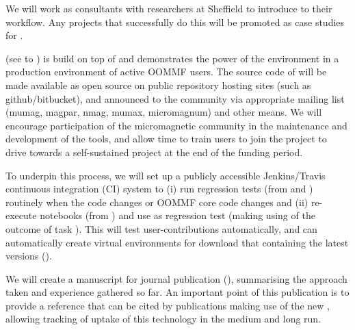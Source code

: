 \begin{workpackage}[id=dissem,wphases=18-48!.5,
  title=Dissemination and Community Building,
  lead=PS,
  PSRM=10, %
  SARM=18,
  USORM=10,
  USHRM=8,
  USRM=24,
  UVRM=2,
  UBRM=4,
]
\begin{tasklist}
\begin{task}[title=Introduce \TheProject to researchers and teachers]
We will work as consultants with researchers at Sheffield to introduce \TheProject to their workflow. Any projects that successfully do this will be promoted as case studies for \TheProject.
\end{task}

\begin{task}[id=dissemination-of-oommf-nb-virtual-environment,
  title=Demonstrator: Open source dissemination of \OOMMFNB{} virtual environment,
  lead=USO,PM=5]
  \OOMMFNB{} (see  to
  ) is build on top of \TheProject and demonstrates the power
  of the environment in a production environment of active OOMMF users. 
  The source code of \OOMMFNB{} will be made available as open source on
  public repository hosting sites (such as github/bitbucket), and
  announced to the community via appropriate mailing list (mumag,
  magpar, nmag, mumax, micromagnum) and other means. We will
  encourage participation of the micromagnetic community in the
  maintenance and development of the tools, and allow time to train
  users to join the \OOMMFNB{} project to drive towards a self-sustained
  \OOMMFNB{} project at the end of the funding period.

  To underpin this process, we will set up a publicly accessible
  Jenkins/Travis continuous integration (CI) system to (i) run
  regression tests (from  and ) routinely when the
  \OOMMFNB{} code changes or OOMMF core code changes and (ii)
  re-execute notebooks (from
  ) and use
  as regression test (making using of the outcome of task ). This will
  test user-contributions automatically, and can automatically create virtual environments
  for download that containing the latest versions ().

  We will create a manuscript for journal publication (), summarising the
  approach taken and experience gathered so far. An important point of
  this publication is to provide a reference that can be cited by
  publications making use of the new \OOMMFNB, allowing tracking of
  uptake of this technology in the medium and long run.
\end{task}

\begin{task}[title=\OOMMFNB{} open source dissemination workshops,
id=dissemination-of-oommf-nb-workshops,lead=USO,PM=6]


\end{task}
\end{tasklist}
\end{workpackage}
